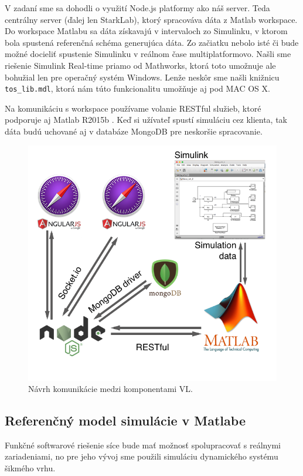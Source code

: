 V zadaní sme sa dohodli o využití Node.js platformy ako náš server. Teda centrálny server (ďalej len StarkLab), ktorý spracováva dáta z Matlab workspace. Do workspace Matlabu sa dáta získavajú v intervaloch zo Simulinku, v ktorom bola spustená referenčná schéma generujúca dáta. Zo začiatku nebolo isté či bude možné docieliť spustenie Simulinku v reálnom čase multiplatformovo. Našli sme riešenie Simulink Real-time priamo od Mathworks, ktorá toto umožnuje ale bohužial len pre operačný systém Windows. Lenže neskôr sme našli knižnicu \verb|tos_lib.mdl|, ktorá nám túto funkcionalitu umožňuje aj pod MAC OS X.

Na komunikáciu s workspace používame volanie RESTful služieb, ktoré podporuje aj Matlab R2015b \cite{matlab-restful}. Keď si užívateľ spustí simuláciu cez klienta, tak dáta budú uchované aj v databáze MongoDB pre neskoršie spracovanie.

\begin{figure}[H]
  \centering
  \includegraphics[scale=0.45]{img/StarkLab.png}
  \caption{Návrh komunikácie medzi komponentami VL.}
  \label{img-software-designl}
\end{figure}

\subsection{Referenčný model simulácie v Matlabe}
Funkčné softwarové riešenie síce bude mať možnosť spolupracovať s reálnymi zariadeniami, no pre jeho vývoj sme použili simuláciu dynamického systému šikmého vrhu.

